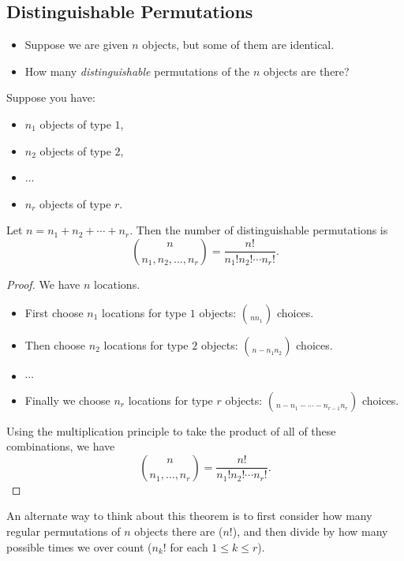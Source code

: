 \documentclass[class=article, crop=false]{standalone}
\begin{document}
  \subsection{Distinguishable Permutations}
  \begin{itemize}
    \item Suppose we are given $n$ objects, but some of them are identical.
    \item How many \emph{distinguishable} permutations of the $n$ objects are there?
  \end{itemize}
  \begin{theorem}{}
    Suppose you have:
    \begin{itemize}
      \item $n_1$ objects of type $1$,
      \item $n_2$ objects of type $2$,
      \item ...
      \item $n_r$ objects of type $r$.
    \end{itemize}
    Let $n = n_1 + n_2 + \dotsb + n_r$. Then the number of distinguishable permutations is
    \[
      \binom{n}{n_1,n_2,\dotsc,n_r} = \frac{n!}{n_1!n_2!\dotsb n_r!}.
    \]
    \begin{proof}
      We have $n$ locations.
      \begin{itemize}
        \item First choose $n_1$ locations for type $1$ objects: $\choose{n}{n_1}$ choices.
        \item Then choose $n_2$ locations for type $2$ objects: $\choose{n - n_1}{n_2}$ choices.
        \item $\dotsb$
        \item Finally we choose $n_r$ locations for type $r$ objects: $\choose{n - n_1 - \dotsb - n_{r - 1}}{n_r}$ choices.
      \end{itemize}
      Using the multiplication principle to take the product of all of these combinations, we have
      \[
        \binom{n}{n_1,\dotsc,n_r} = \frac{n!}{n_1!n_2!\dotsb n_r!}.
      \]
    \end{proof}
  \end{theorem}
  \begin{note}{}
    An alternate way to think about this theorem is to first consider how many regular permutations of $n$ objects there are ($n!$), and then divide by how many possible times we over count ($n_k!$ for each $1\leq k\leq r$). 
  \end{note}
\end{document}

